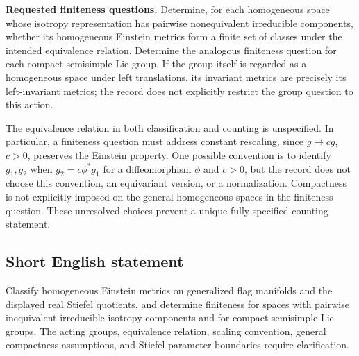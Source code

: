 \documentclass[11pt]{article}
\begin{document}
\textbf{Requested finiteness questions.} Determine, for each homogeneous space whose isotropy representation has pairwise nonequivalent irreducible components, whether its homogeneous Einstein metrics form a finite set of classes under the intended equivalence relation. Determine the analogous finiteness question for each compact semisimple Lie group. If the group itself is regarded as a homogeneous space under left translations, its invariant metrics are precisely its left-invariant metrics; the record does not explicitly restrict the group question to this action.

The equivalence relation in both classification and counting is unspecified. In particular, a finiteness question must address constant rescaling, since \(g\mapsto cg\), \(c>0\), preserves the Einstein property. One possible convention is to identify \(g_1,g_2\) when \(g_2=c\phi^*g_1\) for a diffeomorphism \(\phi\) and \(c>0\), but the record does not choose this convention, an equivariant version, or a normalization. Compactness is not explicitly imposed on the general homogeneous spaces in the finiteness question. These unresolved choices prevent a unique fully specified counting statement.
\subsection{Short English statement}
Classify homogeneous Einstein metrics on generalized flag manifolds and the displayed real Stiefel quotients, and determine finiteness for spaces with pairwise inequivalent irreducible isotropy components and for compact semisimple Lie groups. The acting groups, equivalence relation, scaling convention, general compactness assumptions, and Stiefel parameter boundaries require clarification.
\end{document}
